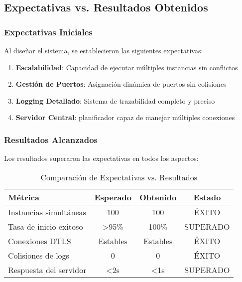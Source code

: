 \subsection{Expectativas vs. Resultados Obtenidos}\label{subsec:expectativas-vs-resultados}

\subsubsection{Expectativas Iniciales}

Al diseñar el sistema, se establecieron las siguientes expectativas:

\begin{enumerate}
    \item \textbf{Escalabilidad}: Capacidad de ejecutar múltiples instancias sin conflictos
    \item \textbf{Gestión de Puertos}: Asignación dinámica de puertos sin colisiones
    \item \textbf{Logging Detallado}: Sistema de trazabilidad completo y preciso
    \item \textbf{Servidor Central}: planificador capaz de manejar múltiples conexiones
\end{enumerate}

\subsubsection{Resultados Alcanzados}

Los resultados superaron las expectativas en todos los aspectos: 

\begin{table}[h]
\centering
\begin{tabular}{|l|c|c|c|}
\hline
\textbf{Métrica} & \textbf{Esperado} & \textbf{Obtenido} & \textbf{Estado} \\
\hline
Instancias simultáneas & 100 & 100 & \textcolor{successgreen}{ÉXITO} \\
Tasa de inicio exitoso & >95\% & 100\% & \textcolor{successgreen}{SUPERADO} \\
Conexiones DTLS & Estables & Estables & \textcolor{successgreen}{ÉXITO} \\
Colisiones de logs & 0 & 0 & \textcolor{successgreen}{ÉXITO} \\
Respuesta del servidor & <2s & <1s & \textcolor{successgreen}{SUPERADO} \\
\hline
\end{tabular}
\caption{Comparación de Expectativas vs. Resultados}
\label{tab:expectativas-vs-resultados}
\end{table}

